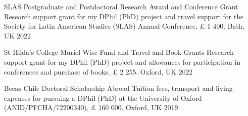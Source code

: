 





\vspace{1mm}

\begin{cvhonors}
\cvhonor
{SLAS Postgraduate and Postdoctoral Research Award and Conference Grant} 
{Research support grant for my DPhil (PhD) project and travel support for the Society for Latin American Studies (SLAS) Annual Conference, {\pounds} 1 400.}
{Bath, UK}
{2022}
\end{cvhonors}

\vspace{1mm}

\begin{cvhonors}
\cvhonor
{St Hilda's College Muriel Wise Fund and Travel and Book Grants} 
{Research support grant for my DPhil (PhD) project and allowances for participation in conferences and purchase of books, {\pounds} 2 255.} 
{Oxford, UK}
{2022}
\end{cvhonors}

\vspace{1mm}

\begin{cvhonors}
\cvhonor
{Becas Chile Doctoral Scholarship Abroad} 
{Tuition fees, transport and living expenses for pursuing a DPhil (PhD) at the University of Oxford (ANID/PFCHA/72200340), {\pounds} 160 000.}
{Oxford, UK}
{2019}
\end{cvhonors}

\vspace{1mm}


